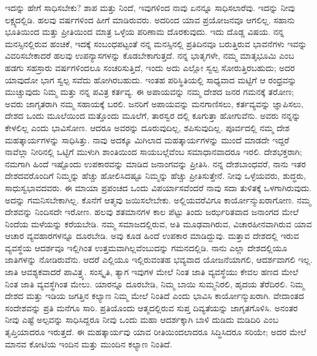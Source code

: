 ಇದನ್ನು ಹೇಗೆ ಸಾಧಿಸಬೇಕು? ಶಾಪ ಮತ್ತು ನಿಂದೆ, ಇವುಗಳಿಂದ ನಾವು ಏನನ್ನೂ ಸಾಧಿಸಲಾರೆವು. ಇದನ್ನು ನೀವು ಲಕ್ಷ್ಯದಲ್ಲಿಡಿ. ಹಲವು ವರ್ಷಗಳಿಂದ ಹೀಗೆ ಮಾಡಿರುವರು. ಅದರಿಂದ ಯಾವ ಪ್ರಯೋಜನವೂ ಆಗಲಿಲ್ಲ. ಸಹಾನು ಭೂತಿಯಿಂದ ಮತ್ತು ಪ್ರೀತಿಯಿಂದ ಮಾತ್ರ ಒಳ್ಳೆಯ ಪರಿಣಾಮ ದೊರಕುವುದು. ಇದು ದೊಡ್ಡ ವಿಷಯ. ನನ್ನ ಮನಸ್ಸಿನಲ್ಲಿರುವ ಹಂಚಿಕೆ, ಇದಕ್ಕೆ ಸಂಬಂಧಪಟ್ಟಂತೆ ನನ್ನ ಮನಸ್ಸಿನಲ್ಲಿ ಪ್ರತಿದಿನವೂ ಬರುತ್ತಿರುವ ಭಾವನೆಗಳು ಇವನ್ನು ವಿವರಿಸಬೇಕಾದರೆ ಹಲವು ಉಪನ್ಯಾಸಗಳನ್ನು ಕೊಡಬೇಕಾಗುತ್ತದೆ. ನನ್ನ ಭಾತೃಗಳೇ, ನಮ್ಮ ಮಾತೃಭೂಮಿ ಎಂಬ ಹಡಗು ಸಹಸ್ರಾರು ವರ್ಷಗಳಿಂದಲೂ ಸಂಚರಿಸುತ್ತಿದೆ, ಇಂದು ಅದು ಎಲ್ಲೋ ಸ್ವಲ್ಪ ಸೋರುತ್ತಿರಬಹುದು; ಅದರ ಯಾವುದೋ ಭಾಗ ಸ್ವಲ್ಪ ಸವೆದು ಹೋಗಿರಬಹುದು. ಇಂತಹ ಪರಿಸ್ಥಿತಿಯಲ್ಲಿ ಸಾಧ್ಯವಾದ ಮಟ್ಟಿಗೆ ಆ ರಂಧ್ರವನ್ನು ಮುಚ್ಚುವುದು ನಿಮ್ಮ ಮತ್ತು ನನ್ನ ಪವಿತ್ರ ಕರ್ತವ್ಯ. ಈ ಅಪಾಯವನ್ನು ನಮ್ಮ ದೇಶದ ಜನರ ಗಮನಕ್ಕೆ ತರೋಣ; ಅವರು ಜಾಗೃತರಾಗಿ ನಮ್ಮ ಸಹಾಯಕ್ಕೆ ಬರಲಿ. ಜನರಿಗೆ ಅಪಾಯವನ್ನು ಮನಗಾಣಿಸಲು, ಕರ್ತವ್ಯವನ್ನು ಜ್ಞಾಪಿಸಲು, ದೇಶದ ಒಂದು ಮೂಲೆಯಿಂದ ಮತ್ತೊಂದು ಮೂಲೆಗೆ, ತಾರಸ್ವರ ದಲ್ಲಿ ಕೂಗುತ್ತಾ ಹೋಗುವೆನು. ಅವರು ನನ್ನನ್ನು ಕೇಳಲಿಲ್ಲ ಎಂದು ಭಾವಿಸೋಣ. ಆದರೂ ಅವರನ್ನು ದೂರುವುದಿಲ್ಲ, ಶಪಿಸುವುದಿಲ್ಲ. ಪೂರ್ವದಲ್ಲಿ ನಮ್ಮ ದೇಶ ಮಹತ್ಕಾರ್ಯಗಳನ್ನು ಸಾಧಿಸಿತ್ತು. ನಾವು ಅದಕ್ಕೂ ಮಿಗಿಲಾದ ಮಹತ್ಕಾರ್ಯಗಳನ್ನು ಮುಂದೆ ಮಾಡದೇ ಇದ್ದರೆ ನಾವೆಲ್ಲಾ ನೀರಿನಲ್ಲಿ ಒಟ್ಟಿಗೆ ಮುಳುಗಿ ಶಾಂತಿಯಿಂದ ಸಾಯಬಲ್ಲೆವೆಂಬ ಸಮಾಧಾನವಾದರೂ ಇರಲಿ. ದೇಶಭಕ್ತರಾಗಿ; ನಮಗಾಗಿ ಹಿಂದೆ ಇಷ್ಟೊಂದು ಉಪಕಾರವನ್ನು ಮಾಡಿದ ಜನಾಂಗವನ್ನು ಪ್ರೀತಿಸಿ. ನನ್ನ ದೇಶಬಾಂಧವರೆ, ನಾನು ಇತರ ದೇಶದವರೊಂದಿಗೆ ನಿಮ್ಮನ್ನು ಹೆಚ್ಚು ಹೋಲಿಸಿದಷ್ಟೂ ನಿಮ್ಮನ್ನು ಹೆಚ್ಚು ಪ್ರೀತಿಸುತ್ತೇನೆ. ನೀವು ಒಳ್ಳೆಯವರು, ಶುದ್ಧರು, ಸಾಧುಸ್ವಭಾವದವರು. ಈ ಮಾಯಾ ಪ್ರಪಂಚದ ಒಂದು ವಿಪರ್ಯಾಸವೆಂದರೆ ನಾವು ಸದಾ ತುಳಿತಕ್ಕೆ ಒಳಗಾಗಿರುವುದು. ಅದನ್ನು ಗಮನಿಸಬೇಕಾಗಿಲ್ಲ. ಕೊನೆಗೆ ಆತ್ಮವು ಜಯಿಸಲೇಬೇಕು. ಅಲ್ಲಿಯವರೆವಿಗೂ ಕಾರ್ಯೋನ್ಮುಖರಾಗೋಣ. ನಮ್ಮ ದೇಶವನ್ನು ನಿಂದಿಸದೇ ಇರೋಣ. ಹಲವು ಶತಮಾನಗಳ ಕಾಲ ಪೆಟ್ಟು ತಿಂದು ಜರ್ಝರಿತವಾದ ಜನಾಂಗದ ಮೇಲೆ ನಿಂದೆಯ ಮಳೆಯನ್ನು ಕರೆಯಬೇಡಿ. ನಮ್ಮ ಸಮಾಜದಲ್ಲಿರುವ, ಅತಿ ಮೂಢವಾಗಿರುವ, ವಿಚಾರಹೀನವಾಗಿರುವ ಯಾವ ಆಚಾರ ವ್ಯವಹಾರಗಳನ್ನೂ ದೂರಬೇಡಿ. ಅವು ಕೂಡ ಹಿಂದೆ ಉಪಕಾರ ಮಾಡಿದ್ದುವು. ಮತ್ತಾವ ದೇಶದಲ್ಲಿ ಇರುವ ವ್ಯವಸ್ಥೆಯ ಆದರ್ಶವೂ ಇಲ್ಲಿಗಿಂತ ಉತ್ತಮವಾಗಿಲ್ಲವೆಂಬುದನ್ನು ಗಮನದಲ್ಲಿಡಿ. ನಾನು ಎಲ್ಲಾ ದೇಶದಲ್ಲಿಯೂ ಜಾತಿಗಳನ್ನು ನೋಡಿರುವೆನು. ಆದರೆ ಎಲ್ಲಿಯೂ ಇಲ್ಲಿರುವಂತಹ ಭವ್ಯವಾದ ಯೋಜನೆಯಾಗಲಿ, ಆದರ್ಶವಾಗಲಿ ಇಲ್ಲ. ಜಾತಿ ಆವಶ್ಯಕವಾದರೆ ಪಾವಿತ್ರ್ಯ. ಸಂಸ್ಕೃತಿ, ತ್ಯಾಗ ಇವುಗಳ ಮೇಲೆ ನಿಂತ ಜಾತಿ ವ್ಯವಸ್ಥೆಯು ಕೇವಲ ಹಣದ ಮೇಲೆ ನಿಂತ ಜಾತಿ ವ್ಯವಸ್ಥೆಗಿಂತ ಮೇಲು. ಯಾರನ್ನೂ ದೂರಬೇಡಿ, ನಿಮ್ಮ ಬಾಯಿ ಸುಮ್ಮನಿರಲಿ, ಹೃದಯ ತೆರೆದಿರಲಿ. ನಿಮ್ಮ ದೇಶದ ಮತ್ತು ಇಡಿಯ ಜಗತ್ತಿನ ಕಲ್ಯಾಣ ನಿಮ್ಮ ಮೇಲೆ ನಿಂತಿದೆ ಎಂದು ಭಾವಿಸಿ ಕಾರ್ಯೋನ್ಮುಖರಾಗಿ. ವೇದಾಂತದ ಸಂದೇಶವನ್ನು ಪ್ರತಿ ಮನೆಗೂ ಸಾರಿ. ಪ್ರತಿಯೊಂದು ಆತ್ಮದಲ್ಲಿರುವ ಸುಪ್ತ ದಿವ್ಯತೆಯನ್ನು ಜಾಗೃತಗೊಳಿಸಿ. ಅನಂತರ ನೀವು ಎಷ್ಟೆ ಅಲ್ಪವನ್ನು ಸಾಧಿಸಿದ್ದರೂ ನೀವು ಒಂದು ಮಹಾ ಆದರ್ಶಕ್ಕಾಗಿ ಬಾಳಿ ದುಡಿದು ಮಡಿದಿರಿ ಎಂಬ ತೃಪ್ತಿಯಾದರೂ ಇರುತ್ತದೆ. ಈ ಮಹತ್ಕಾರ್ಯವು ಯಾವ ರೀತಿಯಿಂದಲಾದರೂ ಸಿದ್ಧಿಸಿದರೂ ಸರಿಯೇ; ಅದರ ಮೇಲೆ ಮಾನವ ಕೋಟಿಯ ಇಂದಿನ ಮತ್ತು ಮುಂದಿನ ಕಲ್ಯಾಣ ನಿಂತಿದೆ. 

